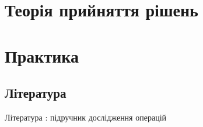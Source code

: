 \documentclass[a5paper,12pt,ukrainian]{book}
\begin{document}
\tableofcontents
\chapter{Теорія прийняття рішень}









\chapter{Практика}




\section{Література}
Література : підручник дослідження операцій \\
\end{document}
